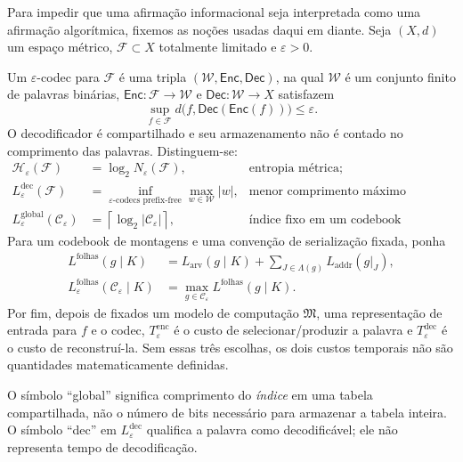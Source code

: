 Para impedir que uma afirmação informacional seja interpretada como uma
afirmação algorítmica, fixemos as noções usadas daqui em diante. Seja
$(X,d)$ um espaço métrico, $\mathcal F\subset X$ totalmente limitado e
$\varepsilon>0$.

\begin{definition}\label{map:artigo_2:3.19}\label{artigo_2:def:coding-resources}
Um $\varepsilon$-codec para $\mathcal F$ é uma tripla
$(\mathcal W,\mathsf{Enc},\mathsf{Dec})$, na qual $\mathcal W$ é um conjunto
finito de palavras binárias, $\mathsf{Enc}:\mathcal F\to\mathcal W$ e
$\mathsf{Dec}:\mathcal W\to X$ satisfazem
\[
 \sup_{f\in\mathcal F}d\bigl(f,\mathsf{Dec}(\mathsf{Enc}(f))\bigr)
 \le\varepsilon.
\]
O decodificador é compartilhado e seu armazenamento não é contado no
comprimento das palavras. Distinguem-se:
\begin{align*}
 \mathcal H_\varepsilon(\mathcal F)
  &=\log_2N_\varepsilon(\mathcal F),
  &&\text{entropia métrica;}\\
 L_\varepsilon^{\mathrm{dec}}(\mathcal F)
  &=\inf_{\text{$\varepsilon$-codecs prefix-free}}
    \max_{w\in\mathcal W}|w|,
  &&\text{menor comprimento máximo decodificável;}\\
 L_\varepsilon^{\mathrm{global}}(\mathcal C_\varepsilon)
  &=\left\lceil\log_2|\mathcal C_\varepsilon|\right\rceil,
  &&\text{índice fixo em um codebook compartilhado.}
\end{align*}
Para um codebook de montagens e uma convenção de serialização fixada, ponha
\begin{align*}
 L^{\mathrm{folhas}}(g\mid K)
   &=L_{\mathrm{arv}}(g\mid K)
     +\sum_{J\in\Lambda(g)}L_{\mathrm{addr}}(g|_J),\\
 L_\varepsilon^{\mathrm{folhas}}(\mathcal C_\varepsilon\mid K)
   &=\max_{g\in\mathcal C_\varepsilon}L^{\mathrm{folhas}}(g\mid K).
\end{align*}
Por fim, depois de fixados um modelo de computação $\mathfrak M$, uma
representação de entrada para $f$ e o codec, $T_\varepsilon^{\mathrm{enc}}$
é o custo de selecionar/produzir a palavra e $T_\varepsilon^{\mathrm{dec}}$ é
o custo de reconstruí-la. Sem essas três escolhas, os dois custos temporais
não são quantidades matematicamente definidas.
\end{definition}

O símbolo ``global'' significa comprimento do \emph{índice} em uma tabela
compartilhada, não o número de bits necessário para armazenar a tabela inteira.
O símbolo ``dec'' em $L_\varepsilon^{\mathrm{dec}}$ qualifica a palavra como
decodificável; ele não representa tempo de decodificação.

